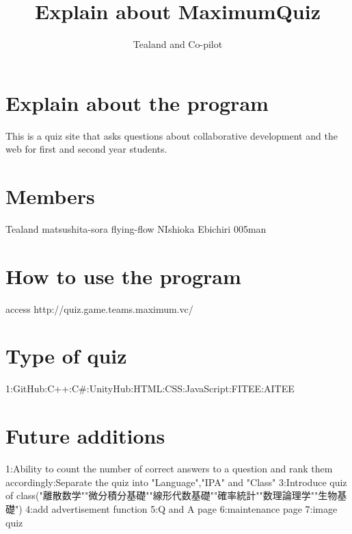 \documentclass{article}%
\title{Explain about MaximumQuiz}  %
\author{Tealand and Co-pilot}
\begin{document}
\maketitle

\section{Explain about the program}

This is a quiz site that asks questions about collaborative development and the web for first and second year students.


\section{Members}

Tealand\newline
matsushita-sora\newline
flying-flow\newline
NIshioka\newline
Ebichiri\newline
005man\newline

\section{How to use the program}

access http://quiz.game.teams.maximum.vc/

\section{Type of quiz}

1:GitHub:C++:C#:UnityHub:HTML:CSS:JavaScript:FITEE:AITEE\newline

\section{Future additions}
1:Ability to count the number of correct answers to a question and rank them accordingly:Separate the quiz into "Language","IPA" and "Class" 
3:Introduce quiz of class("離散数学""微分積分基礎""線形代数基礎""確率統計""数理論理学""生物基礎")
4:add advertisement function
5:Q and A page
6:maintenance page
7:image quiz
\end{document}
